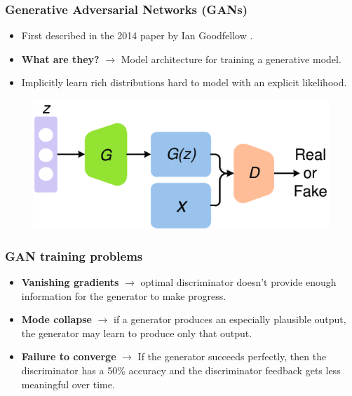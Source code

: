 \documentclass{beamer}
\begin{document}
\begin{frame}
\frametitle{Generative Adversarial Networks (GANs)}
\begin{itemize}
	\item First described in the 2014 paper by Ian Goodfellow \cite{goodfellow2014generative}.
	\item  \textbf{What are they?} $\rightarrow$ Model architecture for training a generative model.
	\item Implicitly learn rich distributions hard to model with an explicit likelihood.
	
	
	
\end{itemize}
\begin{figure}
	\centering
	\begin{minipage}{1\textwidth}
		\centering
		\includegraphics[width=.8\textwidth]{imagenes/gan.png}
		\label{fig:GANArchitecture}
	\end{minipage}%
	
\end{figure}



\end{frame}
\begin{frame}
\frametitle{GAN training problems}

\begin{itemize}
	\item \textbf{Vanishing gradients} $\rightarrow$ optimal discriminator doesn't provide enough information for the generator to make progress.
	\item \textbf{Mode collapse} $\rightarrow$  if a generator produces an especially plausible output, the generator may learn to produce only that output.
	\item \textbf{Failure to converge} $\rightarrow$  If the generator succeeds perfectly, then the discriminator has a 50\% accuracy and the discriminator feedback gets less meaningful over time.
\end{itemize}
\begin{figure}

\end{figure}

\end{frame}
\end{document}
